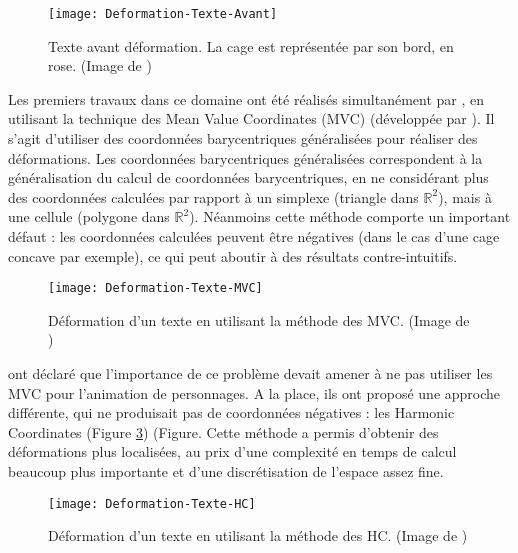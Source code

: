 \begin{figure}[ht]
\begin{center}
\texttt{[image: Deformation-Texte-Avant]}

\caption[Texte avant déformation] {Texte avant déformation. La cage est
représentée par son bord, en rose. (Image de \cite{LLC08})}

\label{DEFAva}
\end{center}
\end{figure}

Les premiers travaux dans ce domaine ont été réalisés simultanément par
\cite{JSW05} \cite{FKR05}, en utilisant la technique des Mean Value
Coordinates (MVC) (développée par \cite{Flo03}). Il s'agit d'utiliser des
coordonnées barycentriques généralisées pour réaliser des déformations. Les
coordonnées barycentriques généralisées correspondent à la généralisation du
calcul de coordonnées barycentriques, en ne considérant plus des coordonnées
calculées par rapport à un simplexe (triangle dans $\mathbb{R}^2$), mais à une
cellule (polygone dans $\mathbb{R}^2$). Néanmoins cette méthode comporte un
important défaut : les coordonnées calculées peuvent être négatives (dans le
cas d'une cage concave par exemple), ce qui peut aboutir à des
résultats contre-intuitifs.

\begin{figure}[ht]
\begin{center}
\texttt{[image: Deformation-Texte-MVC]}

\caption[Déformation d'un texte (MVC)] {Déformation d'un texte en utilisant la
méthode des MVC. (Image de \cite{LLC08})}

\label{DEFMea}
\end{center}
\end{figure}

\cite{JMDGS07} ont déclaré que l'importance de ce problème devait amener à ne
pas utiliser les MVC pour l'animation de personnages. A la place, ils ont
proposé une approche différente, qui ne produisait pas de coordonnées
négatives : les Harmonic Coordinates (Figure \ref{DEFHar}) (Figure. Cette méthode a permis d'obtenir
des déformations plus localisées, au prix d'une complexité en temps de
calcul beaucoup plus importante et d'une discrétisation de l'espace assez
fine.

\begin{figure}[ht]
\begin{center}
\texttt{[image: Deformation-Texte-HC]}

\caption[Déformation d'un texte (HC)] {Déformation d'un texte en utilisant la
méthode des HC. (Image de \cite{LLC08})}

\label{DEFHar}
\end{center}
\end{figure}

